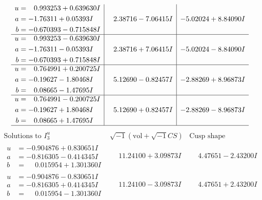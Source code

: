 \documentclass[1p]{elsarticle_modified}
\theoremstyle{definition}
\newcommand{\I}{\sqrt{-1}}
\begin{document}
$$\begin{array}{c|c|c}
\begin{aligned}
u &= \phantom{-}0.993253 + 0.639630 I \\
a &= -1.76311 + 0.05393 I \\
b &= -0.670393 - 0.715848 I\end{aligned}
 & \phantom{-}2.38716 - 7.06415 I & -5.02024 + 8.84090 I \\ \hline\begin{aligned}
u &= \phantom{-}0.993253 - 0.639630 I \\
a &= -1.76311 - 0.05393 I \\
b &= -0.670393 + 0.715848 I\end{aligned}
 & \phantom{-}2.38716 + 7.06415 I & -5.02024 - 8.84090 I \\ \hline\begin{aligned}
u &= \phantom{-}0.764991 + 0.200725 I \\
a &= -0.19627 - 1.80468 I \\
b &= \phantom{-}0.08665 - 1.47695 I\end{aligned}
 & \phantom{-}5.12690 - 0.82457 I & -2.88269 + 8.96873 I \\ \hline\begin{aligned}
u &= \phantom{-}0.764991 - 0.200725 I \\
a &= -0.19627 + 1.80468 I \\
b &= \phantom{-}0.08665 + 1.47695 I\end{aligned}
 & \phantom{-}5.12690 + 0.82457 I & -2.88269 - 8.96873 I\\
 \hline 
 \end{array}$$\newpage$$\begin{array}{c|c|c}  
\text{Solutions to }I^u_{3}& \I (\text{vol} + \sqrt{-1}CS) & \text{Cusp shape}\\
 \hline 
\begin{aligned}
u &= -0.904876 + 0.830651 I \\
a &= -0.816305 - 0.414345 I \\
b &= \phantom{-}0.015954 + 1.301360 I\end{aligned}
 & \phantom{-}11.24100 + 3.09873 I & \phantom{-}4.47651 - 2.43200 I \\ \hline\begin{aligned}
u &= -0.904876 - 0.830651 I \\
a &= -0.816305 + 0.414345 I \\
b &= \phantom{-}0.015954 - 1.301360 I\end{aligned}
 & \phantom{-}11.24100 - 3.09873 I & \phantom{-}4.47651 + 2.43200 I \\ \hline\begin{aligned}

\end{aligned}
\end{array}$$
\end{document}
